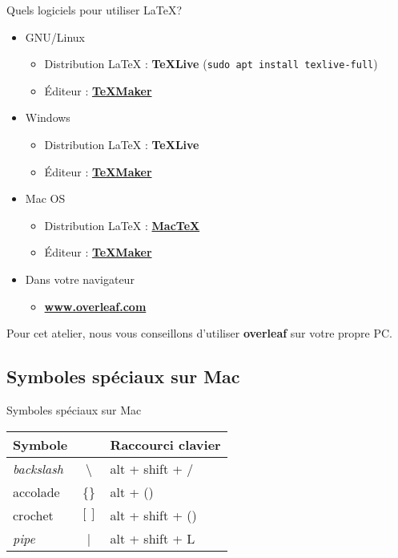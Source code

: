 \begin{frame}{Quels logiciels pour utiliser \LaTeX{}?}
  \begin{itemize}
      \item GNU/Linux
      \begin{itemize}
          \item Distribution \LaTeX{} : \textbf{TeXLive}
          {\tiny (\lstinline|sudo apt install texlive-full|)}
        \item Éditeur : \textbf{\href{http://www.xm1math.net/texmaker/}{TeXMaker}}
      \end{itemize}
      \item Windows
      \begin{itemize}
        \item Distribution \LaTeX{} : \textbf{TeXLive}
        \item Éditeur : \textbf{\href{http://www.xm1math.net/texmaker/}{TeXMaker}}
      \end{itemize}
      \item Mac OS
      \begin{itemize}
        \item Distribution \LaTeX{} : \textbf{\href{https://www.tug.org/mactex/}{MacTeX}}
        \item Éditeur : \textbf{\href{http://www.xm1math.net/texmaker/}{TeXMaker}}
      \end{itemize}
      \item Dans votre navigateur
      \begin{itemize}
        \item \textbf{\url{www.overleaf.com}}
      \end{itemize}
  \end{itemize}
  Pour cet atelier, nous vous conseillons d'utiliser \textbf{overleaf} sur votre propre PC.
\end{frame}

\subsection{Symboles spéciaux sur Mac}

\begin{frame}{Symboles spéciaux sur Mac}
  \begin{center}
    \begin{tabular}{|lc|l|}
      \hline
      Symbole & & Raccourci clavier \\\hline
      \textit{backslash} & \textbackslash & alt + shift + / \\
      accolade & \{\} & alt + () \\
      crochet & $[]$ & alt + shift + () \\
      \textit{pipe} & | & alt + shift + L \\
      \hline
    \end{tabular}
  \end{center}
\end{frame}
